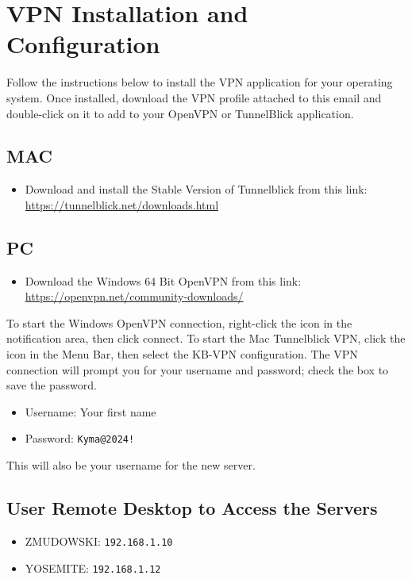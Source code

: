 \documentclass{article}
\begin{document}
\section*{VPN Installation and Configuration}
Follow the instructions below to install the VPN application for your operating system. Once installed, download the VPN profile attached to this email and double-click on it to add to your OpenVPN or TunnelBlick application.

\subsection*{MAC}
\begin{itemize}
    \item Download and install the Stable Version of Tunnelblick from this link:
    \url{https://tunnelblick.net/downloads.html}
\end{itemize}

\subsection*{PC}
\begin{itemize}
    \item Download the Windows 64 Bit OpenVPN from this link:
    \url{https://openvpn.net/community-downloads/}
\end{itemize}

To start the Windows OpenVPN connection, right-click the icon in the notification area, then click connect. To start the Mac Tunnelblick VPN, click the icon in the Menu Bar, then select the KB-VPN configuration. The VPN connection will prompt you for your username and password; check the box to save the password.

\begin{itemize}
    \item Username: Your first name
    \item Password: \texttt{Kyma@2024!}
\end{itemize}

This will also be your username for the new server.

\subsection*{User Remote Desktop to Access the Servers}
\begin{itemize}
    \item ZMUDOWSKI: \texttt{192.168.1.10}
    \item YOSEMITE: \texttt{192.168.1.12}
\end{itemize}
\end{document}
